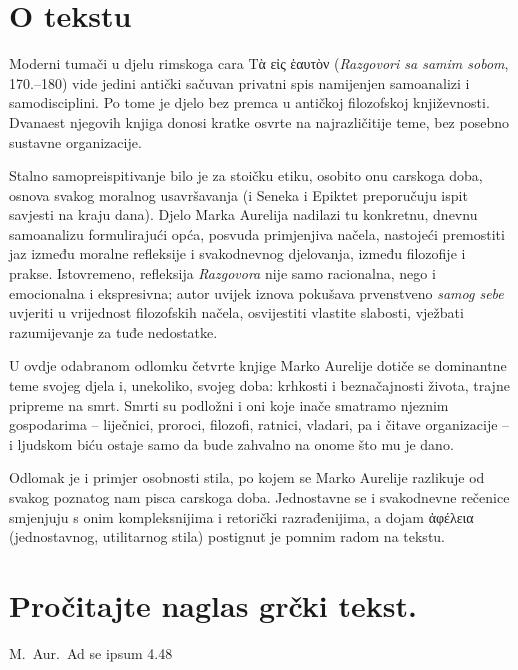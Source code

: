 

\section*{O tekstu}

Moderni tumači u djelu rimskoga cara \textgreek[variant=ancient]{Tὰ εἰς ἑαυτὸν} (\textit{Razgovori sa samim sobom}, 170.–180) vide jedini antički sačuvan privatni spis namijenjen samoanalizi i samodisciplini. Po tome je djelo bez premca u antičkoj filozofskoj književnosti. Dvanaest njegovih knjiga donosi kratke osvrte na najrazličitije teme, bez posebno sustavne organizacije.

Stalno samopreispitivanje bilo je za stoičku etiku, osobito onu carskoga doba, osnova svakog moralnog usavršavanja (i Seneka i Epiktet preporučuju ispit savjesti na kraju dana). Djelo Marka Aurelija nadilazi tu konkretnu, dnevnu samoanalizu formulirajući opća, posvuda primjenjiva načela, nastojeći premostiti jaz između moralne refleksije i svakodnevnog djelovanja, između filozofije i prakse. Istovremeno, refleksija \textit{Razgovora} nije samo racionalna, nego i emocionalna i ekspresivna; autor uvijek iznova pokušava prvenstveno \textit{samog sebe} uvjeriti u vrijednost filozofskih načela, osvijestiti vlastite slabosti, vježbati razumijevanje za tuđe nedostatke.

U ovdje odabranom odlomku četvrte knjige Marko Aurelije dotiče se dominantne teme svojeg djela i, unekoliko, svojeg doba: krhkosti i beznačajnosti života, trajne pripreme na smrt. Smrti su podložni i oni koje inače smatramo njeznim gospodarima – liječnici, proroci, filozofi, ratnici, vladari, pa i čitave organizacije – i ljudskom biću ostaje samo da bude zahvalno na onome što mu je dano.

Odlomak je i primjer osobnosti stila, po kojem se Marko Aurelije razlikuje od svakog poznatog nam pisca carskoga doba. Jednostavne se i svakodnevne rečenice smjenjuju s onim kompleksnijima i retorički razrađenijima, a dojam \textgreek[variant=ancient]{ἀφέλεια} (jednostavnog, utilitarnog stila) postignut je pomnim radom na tekstu.


\section*{Pročitajte naglas grčki tekst.}

M.~Aur.\ Ad se ipsum 4.48


